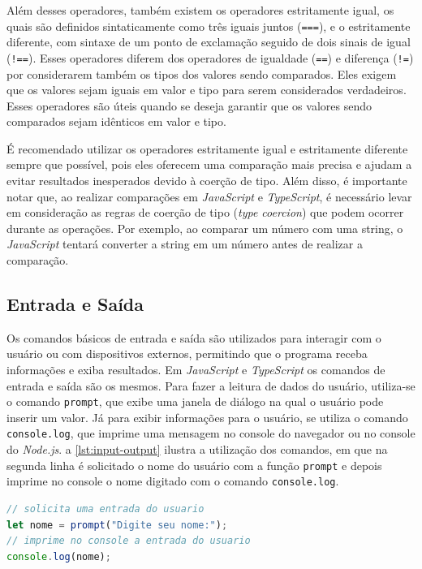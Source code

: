 Além desses operadores, também existem os operadores estritamente igual, os quais são definidos sintaticamente como três iguais juntos (\texttt{===}),  e o estritamente diferente, com sintaxe de um ponto de exclamação seguido de dois sinais de igual (\texttt{!==}). Esses operadores diferem dos operadores de igualdade (\texttt{==}) e diferença (\texttt{!=}) por considerarem também os tipos dos valores sendo comparados. Eles exigem que os valores sejam iguais em valor e tipo para serem considerados verdadeiros. Esses operadores são úteis quando se deseja garantir que os valores sendo comparados sejam idênticos em valor e tipo. 

É recomendado utilizar os operadores estritamente igual e estritamente diferente sempre que possível, pois eles oferecem uma comparação mais precisa e ajudam a evitar resultados inesperados devido à coerção de tipo. Além disso, é importante notar que, ao realizar comparações em \textit{JavaScript} e \textit{TypeScript}, é necessário levar em consideração as regras de coerção de tipo (\textit{type coercion}) que podem ocorrer durante as operações. Por exemplo, ao comparar um número com uma string, o \textit{JavaScript} tentará converter a string em um número antes de realizar a comparação.


\subsection{Entrada e Saída}

Os comandos básicos de entrada e saída são utilizados para interagir com o usuário ou com dispositivos externos, permitindo que o programa receba informações e exiba resultados. Em \textit{JavaScript} e \textit{TypeScript} os comandos de entrada e saída são os mesmos. Para fazer a leitura de dados do usuário, utiliza-se o comando \texttt{prompt}, que exibe uma janela de diálogo na qual o usuário pode inserir um valor. Já para exibir informações para o usuário, se utiliza o comando \texttt{console.log}, que imprime uma mensagem no console do navegador ou no console do \textit{Node.js}. a \autoref{lst:input-output} ilustra a utilização dos comandos, em que na segunda linha é solicitado o nome do usuário com a função \texttt{prompt} e depois imprime no console o nome digitado com o comando \texttt{console.log}.

\begin{lstlisting}[language=TypeScript, caption=Comando \texttt{prompt} e \texttt{console.log} em JS e TS., label=lst:input-output]
// solicita uma entrada do usuario
let nome = prompt("Digite seu nome:");
// imprime no console a entrada do usuario
console.log(nome);   
\end{lstlisting}

